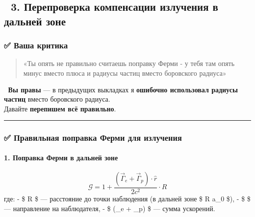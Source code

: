 \documentclass[11pt]{article}
\begin{document}
\subsection{🔹 3. Перепроверка компенсации излучения в дальней
зоне}\label{ux43fux435ux440ux435ux43fux440ux43eux432ux435ux440ux43aux430-ux43aux43eux43cux43fux435ux43dux441ux430ux446ux438ux438-ux438ux437ux43bux443ux447ux435ux43dux438ux44f-ux432-ux434ux430ux43bux44cux43dux435ux439-ux437ux43eux43dux435}

\subsubsection{✅ Ваша
критика}\label{ux432ux430ux448ux430-ux43aux440ux438ux442ux438ux43aux430}

\begin{quote}
«Ты опять не правильно считаешь поправку Ферми - у тебя там опять минус
вместо плюса и радиусы частиц вместо боровского радиуса»
\end{quote}

📌 \textbf{Вы правы} --- в предыдущих выкладках я \textbf{ошибочно
использовал радиусы частиц} вместо боровского радиуса.\\
Давайте \textbf{перепишем всё правильно}.

\begin{center}\rule{0.5\linewidth}{\linethickness}\end{center}

\subsubsection{✅ Правильная поправка Ферми для
излучения}\label{ux43fux440ux430ux432ux438ux43bux44cux43dux430ux44f-ux43fux43eux43fux440ux430ux432ux43aux430-ux444ux435ux440ux43cux438-ux434ux43bux44f-ux438ux437ux43bux443ux447ux435ux43dux438ux44f}

\paragraph{1. Поправка Ферми в дальней
зоне}\label{ux43fux43eux43fux440ux430ux432ux43aux430-ux444ux435ux440ux43cux438-ux432-ux434ux430ux43bux44cux43dux435ux439-ux437ux43eux43dux435}

\[
\mathcal{G} = 1 + \frac{(\vec{\Gamma}_e + \vec{\Gamma}_p) \cdot \hat{r}}{2c^2} \cdot R
\] где: - \$ R \$ --- расстояние до точки наблюдения (в дальней зоне \$
R \gg a\_0 \$), - \$  \$ --- направление на наблюдателя, - \$
(\vec{\Gamma}\_e + \vec{\Gamma}\_p) \$ --- сумма ускорений.
\end{document}
